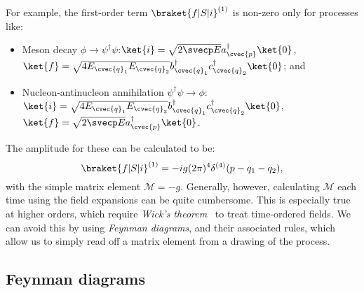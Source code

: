 For example, the first-order term $\braket{f|S|i}^{(1)}$ is non-zero only for processes like:
\begin{itemize}
	\item Meson decay $\phi \rightarrow \psi^\dagger\psi$:\quad $\ket{i} = \sqrt{2\svecp E} a^\dagger_{\cvec{p}} \ket{0}$,\quad $\ket{f} = \sqrt{4 E_{\cvec{q}_1} E_{\cvec{q}_2}} b^\dagger_{\cvec{q}_1} c^\dagger_{\cvec{q}_2} \ket{0}$; and
	\item Nucleon-antinucleon annihilation $\psi^\dagger\psi \rightarrow \phi$:\quad $\ket{i} = \sqrt{4 E_{\cvec{q}_1} E_{\cvec{q}_2}} b^\dagger_{\cvec{q}_1} c^\dagger_{\cvec{q}_2} \ket{0}$,\quad $\ket{f} = \sqrt{2\svecp E} a^\dagger_{\cvec{p}} \ket{0}$.
\end{itemize}
The amplitude for these can be calculated to be:
\begin{equation}
	\label{app:01_qft_interactions_yukawa_smatrix_1}
	\braket{f|S|i}^{(1)} = -ig (2\pi)^4 \delta^{(4)}(p - q_1 - q_2),
\end{equation}
with the simple matrix element $\mathcal M = -g$.
Generally, however, calculating $\mathcal M$ each time using the field expansions can be quite cumbersome.
This is especially true at higher orders, which require \textit{Wick's theorem}~\cite{Wick:1950ee} to treat time-ordered fields.
We can avoid this by using \textit{Feynman diagrams}, and their associated rules, which allow us to simply read off a matrix element from a drawing of the process.

\subsection{Feynman diagrams}
\label{app:01_qft_quantization_feynman}

